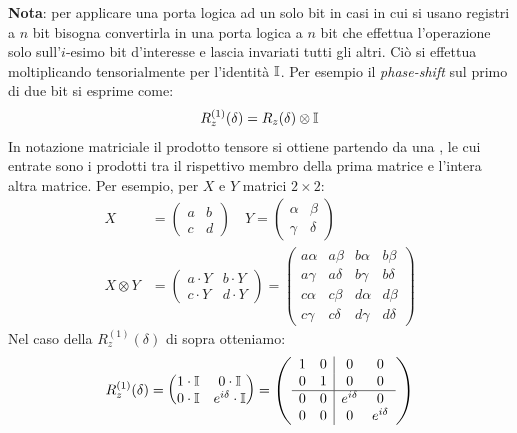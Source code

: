 \documentclass[../../InformazioneQuantistica.tex]{subfiles}
\begin{document}
\textbf{Nota}: per applicare una porta logica ad un solo bit in casi in cui si usano registri a $n$ bit bisogna convertirla in una porta logica a $n$ bit che effettua l'operazione solo sull'$i$-esimo bit d'interesse e lascia invariati tutti gli altri. Ciò si effettua moltiplicando tensorialmente per l'identità $\mathbb{I}$. Per esempio il \textit{phase-shift} sul primo di due bit si esprime come:
\begin{align*}
R_z^{(1)}(\delta) =
R_z(\delta)\otimes \mathbb{I}
\end{align*}
In notazione matriciale il prodotto tensore si ottiene partendo da una , le cui entrate sono i prodotti tra il rispettivo membro della prima matrice e l'intera altra matrice. Per esempio, per $X$ e $Y$ matrici $2\times 2$:
\begin{align*}
X &= \begin{pmatrix}a & b\\c & d\end{pmatrix}\quad Y = \begin{pmatrix} \alpha & \beta\\ \gamma & \delta\end{pmatrix}\\
X \otimes Y &= \begin{pmatrix}a\cdot Y & b\cdot Y\\c\cdot Y & d\cdot Y\end{pmatrix} =
\left(
\begin{array}{cc|cc}
a\alpha & a\beta & b\alpha & b\beta\\
a\gamma & a\delta & b\gamma & b\delta\\ \hline
c\alpha & c\beta & d\alpha & d\beta\\
c\gamma & c\delta & d\gamma & d\delta
\end{array}
\right)
\end{align*}
Nel caso della $R_z^{(1)}(\delta)$ di sopra otteniamo:
\begin{align*}
R_z^{(1)}(\delta) = \begin{pmatrix}
1 \cdot \mathbb{I} & 0\cdot \mathbb{I}\\
0\cdot \mathbb{I} & e^{i\delta}\cdot \mathbb{I}
\end{pmatrix} = \left(
        \begin{array}{cc|cc}
        1 & 0 & 0 & 0 \\
        0 & 1 & 0 & 0 \\
        \hline
        0 & 0 & e^{{i\delta}} & 0 \\
        0 & 0 & 0 & e^{{i\delta}} \\        
        \end{array}
\right) 
\end{align*}
\end{document}
